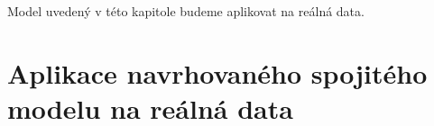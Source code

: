 \documentclass[a4paper,12pt]{report}
\theoremstyle{definition} \newtheorem{definice}[veta]{Definice}
\theoremstyle{remark}
\begin{document}
%

Model uvedený v této kapitole budeme aplikovat na reálná data.


\section{Aplikace navrhovaného spojitého modelu na reálná data}\label{aplikace}
\end{document}
